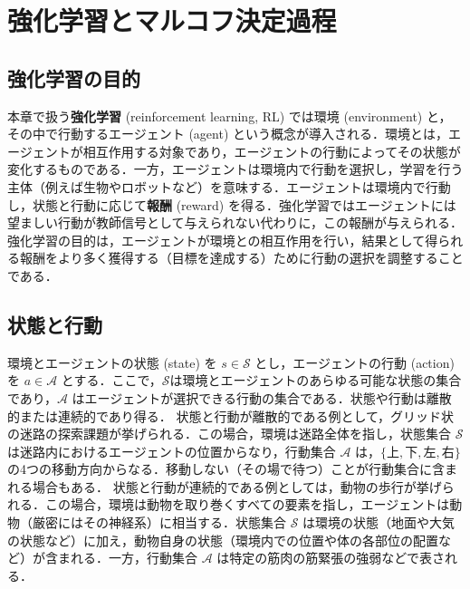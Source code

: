 \section{強化学習とマルコフ決定過程}
\subsection{強化学習の目的}
本章で扱う\textbf{強化学習} (reinforcement learning, RL) では環境 (environment) と，その中で行動するエージェント (agent) という概念が導入される．環境とは，エージェントが相互作用する対象であり，エージェントの行動によってその状態が変化するものである．一方，エージェントは環境内で行動を選択し，学習を行う主体（例えば生物やロボットなど）を意味する．エージェントは環境内で行動し，状態と行動に応じて\textbf{報酬} (reward) を得る．強化学習ではエージェントには望ましい行動が教師信号として与えられない代わりに，この報酬が与えられる．強化学習の目的は，エージェントが環境との相互作用を行い，結果として得られる報酬をより多く獲得する（目標を達成する）ために行動の選択を調整することである．
\subsection{状態と行動}
環境とエージェントの状態 (state) を $s\in \mathcal{S}$ とし，エージェントの行動 (action) を $a \in \mathcal{A}$ とする．ここで，$\mathcal{S}$は環境とエージェントのあらゆる可能な状態の集合であり，$\mathcal{A}$ はエージェントが選択できる行動の集合である．状態や行動は離散的または連続的であり得る．
状態と行動が離散的である例として，グリッド状の迷路の探索課題が挙げられる．この場合，環境は迷路全体を指し，状態集合 $\mathcal{S}$ は迷路内におけるエージェントの位置からなり，行動集合 $\mathcal{A}$ は，$\{上, 下, 左, 右\}$ の4つの移動方向からなる．移動しない（その場で待つ）ことが行動集合に含まれる場合もある．
状態と行動が連続的である例としては，動物の歩行が挙げられる．この場合，環境は動物を取り巻くすべての要素を指し，エージェントは動物（厳密にはその神経系）に相当する．状態集合 $\mathcal{S}$ は環境の状態（地面や大気の状態など）に加え，動物自身の状態（環境内での位置や体の各部位の配置など）が含まれる．一方，行動集合 $\mathcal{A}$ は特定の筋肉の筋緊張の強弱などで表される．

